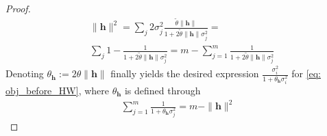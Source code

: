 \documentclass[10pt,a4paper]{amsart}
\newcommand{\bh}{\mathbf{h}}
\begin{document}
\begin{proof}
\begin{align*}
& \|\mathbf{h}\|^2 = \sum_j 2 \sigma_j^2 \frac{\tilde{\theta}\|\mathbf{h}\| }{1 + 2\tilde{\theta}\|\mathbf{h}\|\sigma_j^2} = \\
&  \sum_j 1 - \frac{1}{1 + 2\tilde{\theta}\|\mathbf{h}\|\sigma_j^2} = m - \sum_{j=1}^m \frac{1}{1 + 2\tilde{\theta}\|\mathbf{h}\|\sigma_j^2}
\end{align*}
Denoting $\theta_{\bh} := 2\theta \|\mathbf{h}\|$ finally yields the desired expression $\frac{\sigma_i^2}{1 +\theta_{\bh} \sigma_i^2}$ for \eqref{eq: obj_before_HW}, where $\theta_{\bh}$ is defined through
\begin{align*}
\sum_{j=1}^m \frac{1}{1 + \theta_\bh \sigma_j^2} = m - \|\mathbf{h}\|^2 
\end{align*}

\end{proof}
\end{document}
